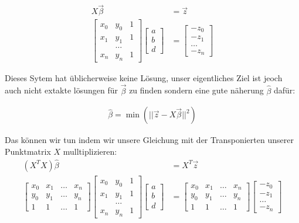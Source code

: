 \documentclass[11pt,oneside,openright]{mpreport}
\begin{document}
\begin{align*}
X \vec{\beta} &= \vec{z}\\
\begin{bmatrix}
x_0 & y_0 & 1 \\
x_1 & y_1 & 1 \\
 & \dots & \\
x_n & y_n & 1 
\end{bmatrix} 
\begin{bmatrix}
a \\
b \\
d 
\end{bmatrix}
&= 
\begin{bmatrix}
-z_0 \\
-z_1 \\
\dots \\
-z_n 
\end{bmatrix} 
\end{align*}

Dieses Sytem hat üblicherweise keine Lösung, unser eigentliches Ziel ist jeoch auch nicht extakte lösungen für $\vec\beta$ zu finden sondern eine gute näherung $\hat{\beta}$ dafür:

\begin{align*}
\hat{\beta} = \min{(|| \vec{z} - X\vec{\beta} ||^2)}
\end{align*}

Das können wir tun indem wir unsere Gleichung mit der Transponierten unserer Punktmatrix $X$ mulltiplizieren:
\begin{align*}
(X^TX) \hat{\beta} &= X^T \vec{z}\\
\begin{bmatrix}
x_0 & x_1 & \dots & x_n \\
y_0 & y_1 & \dots & y_n \\
1 & 1 & \dots & 1  
\end{bmatrix} 
\begin{bmatrix}
x_0 & y_0 & 1 \\
x_1 & y_1 & 1 \\
 & \dots & \\
x_n & y_n & 1 
\end{bmatrix} 
\begin{bmatrix}
a \\
b \\
d 
\end{bmatrix} 
 &= 
\begin{bmatrix}
x_0 & x_1 & \dots & x_n \\
y_0 & y_1 & \dots & y_n \\
1 & 1 & \dots & 1  
\end{bmatrix} 
\begin{bmatrix}
-z_0 \\
-z_1 \\
\dots \\
-z_n 
\end{bmatrix} 
\end{align*}
\end{document}

